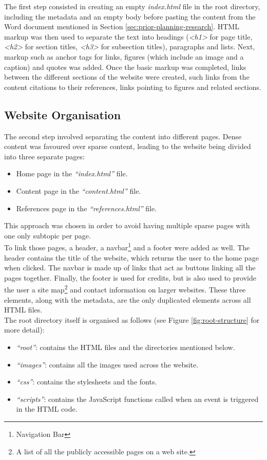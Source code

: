 \documentclass[letterpaper,12pt]{article}
\begin{document}
The first step consisted in creating an empty \textit{index.html} file in the root directory, including the metadata and an empty body before pasting the content from the Word document mentioned in Section \ref{sec:prior-planning-research}. HTML markup was then used to separate the text into headings (\textit{\textless h1\textgreater} for page title, \textit{\textless h2\textgreater} for section titles, \textit{\textless h3\textgreater} for subsection titles), paragraphs and lists. Next, markup such as anchor tags for links, figures (which include an image and a caption) and quotes was added. Once the basic markup was completed, links between the different sections of the website were created, such links from the content citations to their references, links pointing to figures and related sections.

\subsection{Website Organisation}

The second step involved separating the content into different pages. Dense content was favoured over sparse content, leading to the website being divided into three separate pages:
\begin{itemize}
    \item Home page in the \textit{``index.html''} file.
    \item Content page in the \textit{``content.html''} file.
    \item References page in the \textit{``references.html''} file.
\end{itemize}
This approach was chosen in order to avoid having multiple sparse pages with one only subtopic per page.\\

To link those pages, a header, a navbar\footnote{Navigation Bar} and a footer were added as well. The header contains the title of the website, which returns the user to the home page when clicked. The navbar is made up of links that act as buttons linking all the pages together. Finally, the footer is used for credits, but is also used to provide the user a site map\footnote{A list of all the publicly accessible pages on a web site.} and contact information on larger websites. These three elements, along with the metadata, are the only duplicated elements across all HTML files.\\

The root directory itself is organised as follows (see Figure \ref{fig:root-structure} for more detail):
\begin{itemize}
    \item \textit{``root''}: contains the HTML files and the directories mentioned below.
    \item \textit{``images''}: contains all the images used across the website.
    \item \textit{``css''}: contains the stylesheets and the fonts.
    \item \textit{``scripts''}: contains the JavaScript functions called when an event is triggered in the HTML code.
\end{itemize}
\end{document}
